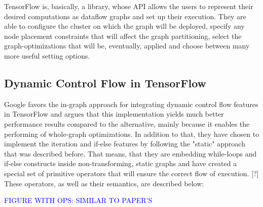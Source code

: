 \documentclass[ack,preface]{dithesis}
\begin{document}
TensorFlow is, basically, a library, whose API allows the users to represent their desired computations as dataflow graphs and set up their execution. 
They are able to configure the cluster on which the graph will be deployed, specify any node placement constraints that will affect the graph partitioning, select the graph-optimizations that will be, eventually, applied and choose between many more useful setting options.
    \subsection{Dynamic Control Flow in TensorFlow}
Google favors the in-graph approach for integrating dynamic control flow features in TensorFlow and argues that this implementation yields much better performance results compared to the alternative, mainly because it enables the performing of whole-graph optimizations. In addition to that, they have chosen to implement the iteration and if-else features by following the "static" approach that was described before. That means, that they are embedding while-loops and if-else constructs inside non-transforming, static graphs and have created a special set of primitive operators that will ensure the correct flow of execution. [?]
These operators, as well as their semantics, are described below:


\textcolor{blue}{FIGURE WITH OPS: SIMILAR TO PAPER'S}
\end{document}
